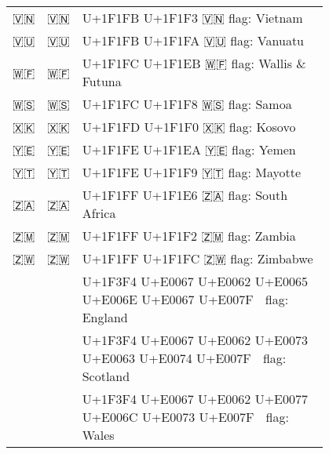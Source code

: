 \documentclass[a4paper,12pt]{ltjarticle}
\newcommand{\fontA}[1]{{\fontspec[RawFeature={mode=harf,+dist,+ccmp}]{Segoe UI Emoji} #1}}
\newcommand{\fontB}[1]{{\fontspec[RawFeature={mode=harf,+dist,+ccmp}]{Noto Color Emoji} #1}}
\begin{document}
\begin{longtable}[c]{ccp{0.8\linewidth}}
\fontA{🇻🇳}&\fontB{🇻🇳}&U+1F1FB U+1F1F3 🇻🇳 flag: Vietnam\\
\fontA{🇻🇺}&\fontB{🇻🇺}&U+1F1FB U+1F1FA 🇻🇺 flag: Vanuatu\\
\fontA{🇼🇫}&\fontB{🇼🇫}&U+1F1FC U+1F1EB 🇼🇫 flag: Wallis \& Futuna\\
\fontA{🇼🇸}&\fontB{🇼🇸}&U+1F1FC U+1F1F8 🇼🇸 flag: Samoa\\
\fontA{🇽🇰}&\fontB{🇽🇰}&U+1F1FD U+1F1F0 🇽🇰 flag: Kosovo\\
\fontA{🇾🇪}&\fontB{🇾🇪}&U+1F1FE U+1F1EA 🇾🇪 flag: Yemen\\
\fontA{🇾🇹}&\fontB{🇾🇹}&U+1F1FE U+1F1F9 🇾🇹 flag: Mayotte\\
\fontA{🇿🇦}&\fontB{🇿🇦}&U+1F1FF U+1F1E6 🇿🇦 flag: South Africa\\
\fontA{🇿🇲}&\fontB{🇿🇲}&U+1F1FF U+1F1F2 🇿🇲 flag: Zambia\\
\fontA{🇿🇼}&\fontB{🇿🇼}&U+1F1FF U+1F1FC 🇿🇼 flag: Zimbabwe\\
\fontA{🏴󠁧󠁢󠁥󠁮󠁧󠁿}&\fontB{🏴󠁧󠁢󠁥󠁮󠁧󠁿}&U+1F3F4 U+E0067 U+E0062 U+E0065 U+E006E U+E0067 U+E007F 🏴󠁧󠁢󠁥󠁮󠁧󠁿 flag: England\\
\fontA{🏴󠁧󠁢󠁳󠁣󠁴󠁿}&\fontB{🏴󠁧󠁢󠁳󠁣󠁴󠁿}&U+1F3F4 U+E0067 U+E0062 U+E0073 U+E0063 U+E0074 U+E007F 🏴󠁧󠁢󠁳󠁣󠁴󠁿 flag: Scotland\\
\fontA{🏴󠁧󠁢󠁷󠁬󠁳󠁿}&\fontB{🏴󠁧󠁢󠁷󠁬󠁳󠁿}&U+1F3F4 U+E0067 U+E0062 U+E0077 U+E006C U+E0073 U+E007F 🏴󠁧󠁢󠁷󠁬󠁳󠁿 flag: Wales\\
\end{longtable}
\end{document}

